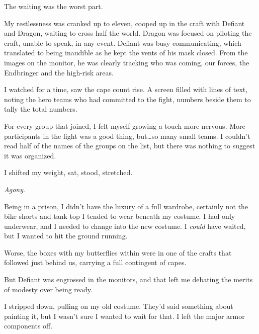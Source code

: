 





The waiting was the worst part.



My restlessness was cranked up to eleven, cooped up in the craft with Defiant and Dragon, waiting to cross half the world.  Dragon was focused on piloting the craft, unable to speak, in any event.  Defiant was busy communicating, which translated to being inaudible as he kept the vents of his mask closed.  From the images on the monitor, he was clearly tracking who was coming, our forces, the Endbringer and the high-risk areas.



I watched for a time, saw the cape count rise.  A screen filled with lines of text, noting the hero teams who had committed to the fight, numbers beside them to tally the total numbers.



For every group that joined, I felt myself growing a touch more nervous.  More participants in the fight was a good thing, but\ldots so many small teams.  I couldn't read half of the names of the groups on the list, but there was nothing to suggest it was organized.



I shifted my weight, sat, stood, stretched.



\emph{Agony}.



Being in a prison, I didn't have the luxury of a full wardrobe, certainly not the bike shorts and tank top I tended to wear beneath my costume.  I had only underwear, and I needed to change into the new costume.  I \emph{could} have waited, but I wanted to hit the ground running.



Worse, the boxes with my butterflies within were in one of the crafts that followed just behind us, carrying a full contingent of capes.



But Defiant was engrossed in the monitors, and that left me debating the merits of modesty over being ready.



I stripped down, pulling on my old costume.  They'd said something about painting it, but I wasn't sure I wanted to wait for that.  I left the major armor components off.



